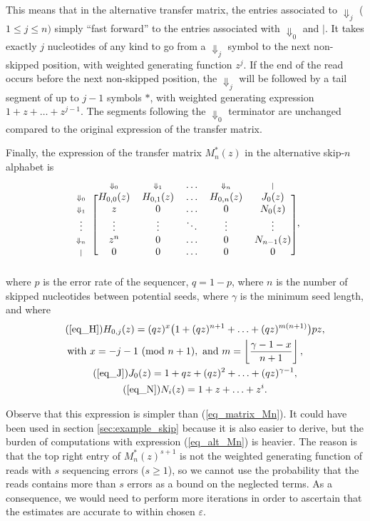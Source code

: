 \documentclass{article}
\newcommand{\Dn}[1]{\scriptstyle{\Downarrow_{#1}}}
\newcommand{\nd}{\scriptstyle{|}}
\newcommand{\modulo}[1]{\ (\mathrm{mod}\ #1)}
\begin{document}
This means that in the alternative transfer matrix, the entries associated
to $\Downarrow_j$ ($1 \leq j \leq n)$ simply ``fast forward'' to the
entries associated with $\Downarrow_0$ and $|$. It takes exactly $j$
nucleotides of any kind to go from a $\Downarrow_j$ symbol to the next
non-skipped position, with weighted generating function $z^j$. If the end
of the read occurs before the next non-skipped position, the
$\Downarrow_j$ will be followed by a tail segment of up to $j-1$ symbols
$*$, with weighted generating expression $1 + z + \ldots + z^{j-1}$. The
segments following the $\Downarrow_0$ terminator are unchanged compared to
the original expression of the transfer matrix.

Finally, the expression of  the transfer matrix $M_n^*(z)$ in the
alternative skip-$n$ alphabet is
\begin{equation}
\label{eq_alt_Mn}
\begin{blockarray}{cccccc}
   & \Dn{0} & \Dn{1} & \ldots & \Dn{n} & \nd \\
\begin{block}{c[ccccc]}
\Dn{0} & H_{0,0}(z) & H_{0,1}(z) & \ldots & H_{0,n}(z) & J_0(z) \\
\Dn{1} & z & 0 & \ldots & 0 & N_0(z) \\
\vdots & \vdots & \vdots & \ddots & \vdots & \vdots \\
\Dn{n} & z^n & 0 & \ldots & 0 & N_{n-1}(z) \\
\nd & 0 & 0 & \ldots & 0 & 0 \\
\end{block}
\end{blockarray},
\end{equation}
where $p$ is the error rate of the sequencer, $q=1-p$, where $n$ is the
number of skipped nucleotides between potential seeds, where $\gamma$ is
the minimum seed length, and where
\begin{gather}
\tag{\ref{eq_H}}
H_{0,j}(z) = (qz)^x\big( 1 + (qz)^{n+1} +
  \ldots + (qz)^{m(n+1)} \big) pz, \\
\notag
  \text{with } x = -j-1 \modulo{n+1},
  \text{ and } m = \left\lfloor
  \frac{\gamma-1-x}{n+1} \right\rfloor, \\
\tag{\ref{eq_J}}
J_0(z) = 1 + qz + (qz)^2 + \ldots + (qz)^{\gamma-1}, \\
\tag{\ref{eq_N}}
N_i(z) = 1+z+\ldots+z^i.
\end{gather}

Observe that this expression is simpler than (\ref{eq_matrix_Mn}). It
could have been used in section \ref{sec:example_skip} because it is also
easier to derive, but the burden of computations with expression
(\ref{eq_alt_Mn}) is heavier. The reason is that the top right entry of
$M^*_n(z)^{s+1}$ is not the weighted generating function of reads with $s$
sequencing errors ($s \geq 1$), so we cannot use the probability that the
reads contains more than $s$ errors as a bound on the neglected terms. As
a consequence, we would need to perform more iterations in order to
ascertain that the estimates are accurate to within chosen $\varepsilon$.
\end{document}
